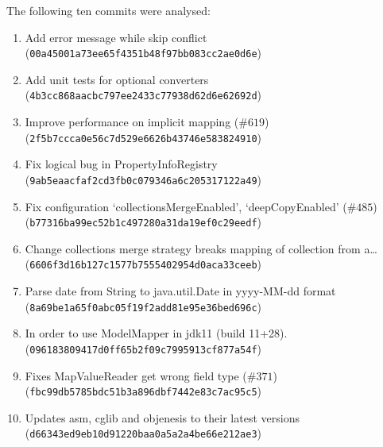 \documentclass[12pt]{article}
\begin{document}
The following ten commits were analysed:

\begin{enumerate}
    \item Add error message while skip conflict
        (\texttt{00a45001a73ee65f4351b48f97bb083cc2ae0d6e})
    \item Add unit tests for optional converters
        (\texttt{4b3cc868aacbc797ee2433c77938d62d6e62692d})
    \item Improve performance on implicit mapping (#$619$)
        \newline
        (\texttt{2f5b7ccca0e56c7d529e6626b43746e583824910})
    \item Fix logical bug in PropertyInfoRegistry
        (\texttt{9ab5eaacfaf2cd3fb0c079346a6c205317122a49})
    \item Fix configuration `collectionsMergeEnabled',
        `deepCopyEnabled' (#$485$) \newline
        (\texttt{b77316ba99ec52b1c497280a31da19ef0c29eedf}) 
    \item Change collections merge strategy breaks mapping of
        collection from a\ldots \newline
        (\texttt{6606f3d16b127c1577b7555402954d0aca33ceeb})
    \item Parse date from String to java.util.Date in yyyy-MM-dd
        format \newline
        (\texttt{8a69be1a65f0abc05f19f2add81e95e36bed696c})
    \item In order to use ModelMapper in jdk11 (build 11+28).
        \newline
        (\texttt{096183809417d0ff65b2f09c7995913cf877a54f})
    \item Fixes MapValueReader get wrong field type (#$371$)
        \newline
        (\texttt{fbc99db5785bdc51b3a896dbf7442e83c7ac95c5}) 
    \item Updates asm, cglib and objenesis to their latest
        versions \newline
        (\texttt{d66343ed9eb10d91220baa0a5a2a4be66e212ae3})
\end{enumerate}
\end{document}
